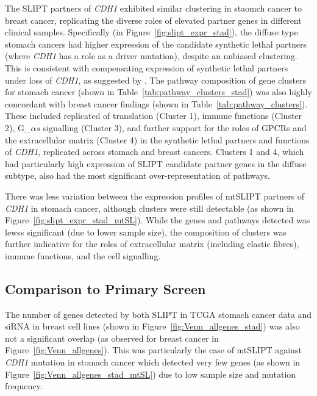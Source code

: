 The \gls{SLIPT} partners of \textit{CDH1} exhibited similar clustering in staomch cancer to breast cancer, replicating the diverse roles of elevated partner genes in different clinical samples. Specifically (in Figure~\ref{fig:slipt_expr_stad}), the diffuse type stomach cancers had higher expression of the candidate synthetic lethal partners (where \textit{CDH1} has a role as a driver mutation), despite an unbiased clustering. This is consistent with compensating expression of synthetic lethal partners under loss of \textit{CDH1}, as suggested by \citet{Lu2015}. The pathway composition of gene clusters for stomach cancer (shown in Table~\ref{tab:pathway_clusters_stad}) was also highly concordant with breast cancer findings (shown in Table~\ref{tab:pathway_clusters}). These included replicated of translation (Cluster 1), immune functions (Cluster 2), G_${\alpha s}$ signalling (Cluster 3), and further support for the roles of GPCRs and the extracellular matrix (Cluster 4) in the synthetic lethal partners and functions of \textit{CDH1}, replicated across stomach and breast cancers. Clusters 1 and 4, which had particularly high expression of \gls{SLIPT} candidate partner genes in the diffuse subtype, also had the most significant over-representation of pathways.

There was less variation between the expression profiles of mtSLIPT partners of \textit{CDH1} in stomach cancer, although clusters were still detectable (as shown in Figure~\ref{fig:slipt_expr_stad_mtSL}). While the genes and pathways detected was lewss significant (due to lower sample size), the composition of clusters was further indicative for the roles of extracellular matrix (including elastic fibres), immune functions, and the cell signalling.

\FloatBarrier

\subsection{Comparison to Primary Screen} \label{chapt3:compare_SL_genes_stad}

The number of genes detected by both \gls{SLIPT} in TCGA stomach cancer data and siRNA in breast cell lines (shown in Figure~\ref{fig:Venn_allgenes_stad}) was also not a significant overlap (as observed for breast cancer in Figure~\ref{fig:Venn_allgenes}). This was particularly the case of mtSLIPT against \textit{CDH1} mutation in stomach cancer which detected very few genes (as shown in Figure~\ref{fig:Venn_allgenes_stad_mtSL}) due to low sample size and mutation frequency.

